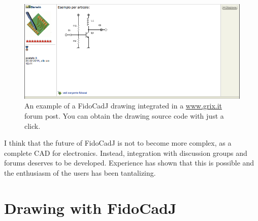 \documentclass[10pt,a4paper,twoside]{scrreprt}
\begin{document}
\begin{figure}
 \includegraphics[width=\textwidth]{fidocadj_grix3.png}
 \caption{An example of a FidoCadJ drawing integrated in a \href{http://www.grix.it}{www.grix.it} forum post. You can obtain the drawing source code with just a click.}
 \label{fig_fidocadj_grix3}
\end{figure}

I think that the future of FidoCadJ is not to become more complex, as a complete CAD for electronics. Instead, integration with discussion groups and forums deserves to be developed. Experience has shown that this is possible and the enthusiasm of the users has been tantalizing.

\chapter{Drawing with FidoCadJ}
\end{document}
